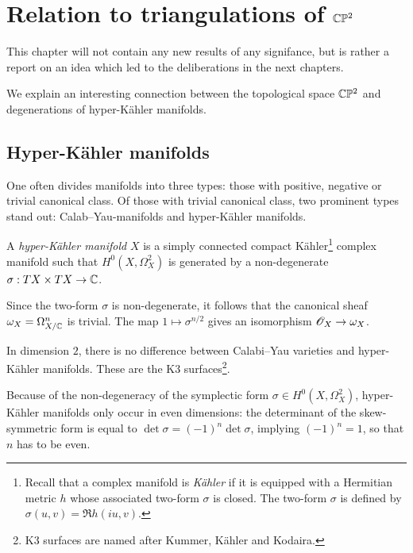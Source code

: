\chapter{Relation to triangulations of \texorpdfstring{$\mathbb{C}\mathbb{P}^2$}{CP2}}
\label{sec:cp2triangs}

This chapter will not contain any new results of any signifance, but is rather a report on an idea which led to the deliberations in the next chapters.

We explain an interesting connection between the topological space $\mathbb{C} \mathbb{P}^2$ and degenerations of hyper-Kähler manifolds.

\section{Hyper-Kähler manifolds} %
\label{sec:hyper_kähler_manifolds}

One often divides manifolds into three types: those with positive, negative or trivial canonical class. Of those with trivial canonical class, two prominent types stand out: Calab--Yau-manifolds and hyper-Kähler manifolds.

\begin{definition}
A \emph{hyper-Kähler manifold} $X$ is a simply connected compact Kähler\footnote{Recall that a complex manifold is \emph{Kähler} if it is equipped with a Hermitian metric $h$ whose associated two-form $\sigma$ is closed. The two-form $\sigma$ is defined by $\sigma(u,v) = \Re h(iu,v)$.} complex manifold such that $H^0(X, \Omega_X^2)$ is generated by a non-degenerate $\sigma: TX \times TX \to \mathbb{C}$.
\end{definition}

\begin{remark}
Since the two-form $\sigma$ is non-degenerate, it follows that the canonical sheaf $\omega_X=\Omega_{X/\mathbb{C}}^n$ is trivial. The map $1 \mapsto \sigma^{n/2}$ gives an isomorphism $\mathscr{O}_X \to \omega_X$. 
\end{remark}

\begin{remark}
In dimension $2$, there is no difference between Calabi--Yau varieties and hyper-Kähler manifolds. These are the K3 surfaces\footnote{K3 surfaces are named after Kummer, Kähler and Kodaira.}. 
\end{remark}

Because of the non-degeneracy of the symplectic form $\sigma \in H^0(X, \Omega_X^2)$, hyper-Kähler manifolds only occur in even dimensions: the determinant of the skew-symmetric form is equal to $\det \sigma = (-1)^n \det \sigma$, implying $(-1)^n=1$, so that $n$ has to be even.

